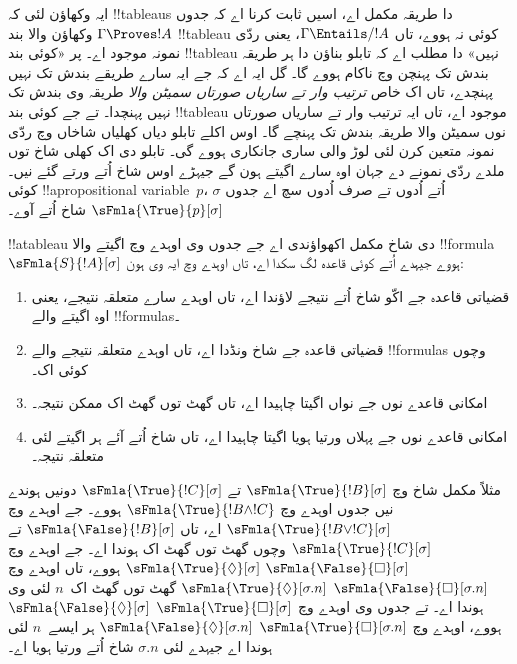 \documentclass[../../../include/open-logic-section]{subfiles}
\begin{document}


\begin{explain}
  ایہ وکھاؤن لئی کہ !!{tableau}s دا طریقہ مکمل اے، اسیں ثابت کرنا اے
  کہ جدوں $\Gamma \Proves !A$ وکھاؤن والا بند !!{tableau} کوئی نہ ہووے،
  تاں $\Gamma \Entails/ !A$، یعنی ردّی نمونہ موجود اے۔ پر «کوئی بند
  !!{tableau} نہیں» دا مطلب اے کہ تابلو بناؤن دا ہر طریقہ بندش تک پہنچن
  وچ ناکام ہووے گا۔ گل ایہ اے کہ جے ایہ سارے طریقے بندش تک نہیں پہنچدے،
  تاں اک خاص \emph{ترتیب وار تے ساریاں صورتاں سمیٹن والا} طریقہ وی
  بندش تک نہیں پہنچدا۔ تے جے کوئی بند !!{tableau} موجود اے، تاں ایہ
  ترتیب وار تے ساریاں صورتاں نوں سمیٹن والا طریقہ بندش تک پہنچے گا۔
  اوس اکلے تابلو دیاں کھلیاں شاخاں وچ ردّی نمونہ متعین کرن لئی لوڑ والی
  ساری جانکاری ہووے گی۔ تابلو دی اک کھلی شاخ توں ملدے ردّی نمونے دے
  جہان اوہ سارے اگیتے ہون گے جیہڑے اوس شاخ اُتے ورتے گئے نیں۔ کوئی
  !!a{propositional
    variable}~$p$، $\sigma$ اُتے اُدوں تے صرف اُدوں سچ اے
  جدوں $\sFmla{\True}{p}[\sigma]$ شاخ اُتے آوے۔
\end{explain}

\begin{defn}
  !!a{tableau} دی شاخ مکمل اکھواؤندی اے جے جدوں وی اوہدے وچ اگیتے والا
  !!{formula} $\sFmla{S}{!A}[\sigma]$ ہووے جیہدے اُتے کوئی قاعدہ
  لگ سکدا اے، تاں اوہدے وچ ایہ وی ہون:
  \begin{enumerate}
    \item قضیاتی قاعدہ جے اکّو شاخ اُتے نتیجے لاؤندا اے، تاں اوہدے
      سارے متعلقہ نتیجے، یعنی اوہ اگیتے والے !!{formula}s۔
    \item قضیاتی قاعدہ جے شاخ ونڈدا اے، تاں اوہدے متعلقہ نتیجے والے
      !!{formula}s وچوں کوئی اک۔
    \item امکانی قاعدے نوں جے نواں اگیتا چاہیدا اے، تاں گھٹ توں گھٹ
      اک ممکن نتیجہ۔
    \item امکانی قاعدے نوں جے پہلاں ورتیا ہویا اگیتا چاہیدا اے، تاں
      شاخ اُتے آئے ہر اگیتے لئی متعلقہ نتیجہ۔
  \end{enumerate}
\end{defn}

\begin{explain}
مثلاً مکمل شاخ وچ $\sFmla{\True}{!B}[\sigma]$ تے
$\sFmla{\True}{!C}[\sigma]$ دونیں ہوندے نیں جدوں اوہدے وچ
$\sFmla{\True}{!B \land !C}$ ہووے۔ جے اوہدے وچ
$\sFmla{\True}{!B \lor !C}[\sigma]$ اے، تاں
$\sFmla{\False}{!B}[\sigma]$ تے $\sFmla{\True}{!C}[\sigma]$ وچوں
گھٹ توں گھٹ اک ہوندا اے۔ جے اوہدے وچ 
{$\sFmla{\False}{\Box}[\sigma]$} {$\sFmla{\True}{\Diamond}[\sigma]$}
ہووے، تاں اوہدے وچ  {$\sFmla{\False}{\Box}[\sigma.n]$}
{$\sFmla{\True}{\Diamond}[\sigma.n]$} گھٹ توں گھٹ اک~$n$ لئی وی ہوندا اے۔ تے جدوں وی اوہدے وچ  {$\sFmla{\True}{\Box}[\sigma]$}
{$\sFmla{\False}{\Diamond}[\sigma]$} ہووے، اوہدے وچ 
{$\sFmla{\True}{\Box}[\sigma.n]$}
{$\sFmla{\False}{\Diamond}[\sigma.n]$} ہر ایسے~$n$ لئی ہوندا اے
جیہدے لئی $\sigma.n$ شاخ اُتے ورتیا ہویا اے۔
\end{explain}
\end{document}
